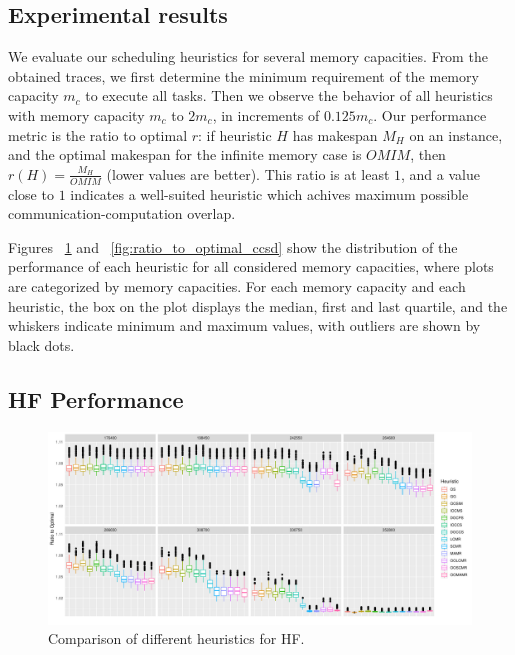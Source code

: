 \documentclass[sigconf]{acmart}
\begin{document}
{		\subsection{Experimental results}
		We evaluate our scheduling heuristics for several memory capacities. From the obtained traces, we first determine the minimum requirement of the memory capacity $m_c$ to execute all tasks. Then we observe the behavior of all heuristics with memory capacity $m_c$ to $2m_c$, in increments of $0.125m_c$. Our performance metric is the ratio to optimal $r$: if heuristic $H$ has makespan $M_H$ on an instance, and the optimal makespan for the infinite memory case is $OMIM$, then $r(H)=\frac{M_H}{OMIM}$ (lower values are better). This ratio is at least $1$, and a value close to $1$ indicates a well-suited  heuristic which achives maximum possible communication-computation overlap.
		
		Figures ~\ref{fig:ratio_to_optimal_hf} and ~\ref{fig:ratio_to_optimal_ccsd} show the distribution of the performance of each heuristic for all considered memory capacities, where plots are categorized by memory capacities. For each memory capacity and each heuristic, the box on the plot displays the median, first and last quartile, and the whiskers indicate minimum and maximum values, with outliers are shown by black dots.
		\subsection{HF Performance}	
		\begin{figure}[htb]
			\includegraphics[scale=0.5]{./all-binpack/ratio_to_optimal_selected_hf.pdf}
			\caption{Comparison of different heuristics for HF.}
			\label{fig:ratio_to_optimal_hf}
		\end{figure}
		
}
\end{document}
